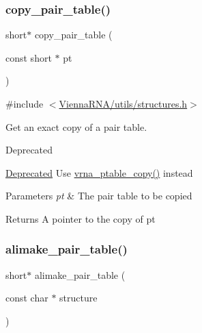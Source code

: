\subsubsection{\texorpdfstring{copy\+\_\+pair\+\_\+table()}{copy\_pair\_table()}}
{\footnotesize\ttfamily short$\ast$ copy\+\_\+pair\+\_\+table (\begin{DoxyParamCaption}\item[{const short $\ast$}]{pt }\end{DoxyParamCaption})}



{\ttfamily \#include $<$\hyperlink{utils_2structures_8h}{Vienna\+R\+N\+A/utils/structures.\+h}$>$}



Get an exact copy of a pair table. 

\begin{DoxyRefDesc}{Deprecated}
\item[\hyperlink{deprecated__deprecated000186}{Deprecated}]Use \hyperlink{group__struct__utils__pair__table_ga2daefbbd6d9f8803731651882f54332d}{vrna\+\_\+ptable\+\_\+copy()} instead\end{DoxyRefDesc}

\begin{DoxyParams}{Parameters}
{\em pt} & The pair table to be copied \\
\hline
\end{DoxyParams}
\begin{DoxyReturn}{Returns}
A pointer to the copy of \textquotesingle{}pt\textquotesingle{} 
\end{DoxyReturn}
\mbox{\label{group__struct__utils__deprecated_ga3c81b3967056c3888b8472b65fbb16f5}} 
\subsubsection{\texorpdfstring{alimake\+\_\+pair\+\_\+table()}{alimake\_pair\_table()}}
{\footnotesize\ttfamily short$\ast$ alimake\+\_\+pair\+\_\+table (\begin{DoxyParamCaption}\item[{const char $\ast$}]{structure }\end{DoxyParamCaption})}



